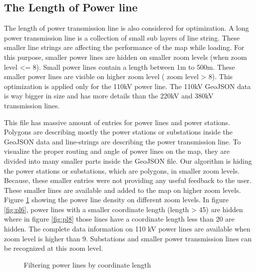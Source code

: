 \subsection{The Length of Power line}

The length of power transmission line is also considered for optimization. A long power transmission line is a collection of small sub layers of line string. These smaller line strings are affecting the performance of the map while loading.  For this purpose, smaller power lines are hidden on smaller zoom levels (when zoom level <= 8).  Small power lines contain a length between 1m to 500m. These smaller power lines are visible on higher zoom level ( zoom level > 8). This optimization is applied only for the 110kV power line. The 110kV GeoJSON data is way bigger in size and has more details than the 220kV and 380kV transmission lines. 

This file has massive amount of entries for power lines and power stations. Polygons are describing mostly the power stations or substations inside the GeoJSON data and line-strings are describing the power transmission line. To visualize the proper routing and angle of power lines on the map, they are divided into many smaller parts inside the GeoJSON file. Our algorithm is hiding the power stations or substations, which are polygons, in smaller zoom levels. Because, these smaller entries were not providing any useful feedback to the user. These smaller lines are available and added to the map on higher zoom levels. Figure \ref{fig:plfilter} showing the power line density on different zoom levels. In figure \ref{fig:pl6}, power lines with a smaller coordinate length (length > 45) are hidden where in figure \ref{fig:pl8} those lines have a coordinate length less than 20 are hidden. The complete data information on 110 kV power lines are available when zoom level is higher than 9. Substations and smaller power transmission lines can be recognized at this zoom level. 

\begin{figure}
  \begin{center}
\hfill
{}
\hfill
\caption{Filtering power lines by coordinate length}
\label{fig:plfilter}
\end{center}
\end{figure}

